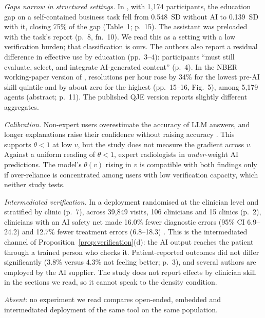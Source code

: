 \documentclass[12pt]{article}
\theoremstyle{remark}
\begin{document}
\emph{Gaps narrow in structured settings.} In \citet{cruces2026narrow}, with 1,174 participants, the education gap on a self-contained business task fell from 0.548~SD without AI to 0.139~SD with it, closing 75\% of the gap (Table~1; p.~15). The assistant was preloaded with the task's report (p.~8, fn.~10). We read this as a setting with a low verification burden; that classification is ours. The authors also report a residual difference in effective use by education (pp.~3--4): participants ``must still evaluate, select, and integrate AI-generated content'' (p.~4). In the NBER working-paper version of \citet{brynjolfsson2025work}, resolutions per hour rose by 34\% for the lowest pre-AI skill quintile and by about zero for the highest (pp.~15--16, Fig.~5), among 5,179 agents (abstract; p.~11). The published QJE version reports slightly different aggregates.

\emph{Calibration.} Non-expert users overestimate the accuracy of LLM answers, and longer explanations raise their confidence without raising accuracy \citep[arXiv v2, pp.~12--13; 301 participants, p.~8]{steyvers2025know}. This supports $\theta<1$ at low $v$, but the study does not measure the gradient across $v$. Against a uniform reading of $\theta<1$, expert radiologists in \citet[abstract]{agarwal2023radiology} \emph{under}-weight AI predictions. The model's $\theta(v)$ rising in $v$ is compatible with both findings only if over-reliance is concentrated among users with low verification capacity, which neither study tests.

\emph{Intermediated verification.} In a deployment randomised at the clinician level and stratified by clinic (p.~7), across 39,849 visits, 106 clinicians and 15 clinics (p.~2), clinicians with an AI safety net made 16.0\% fewer diagnostic errors (95\% CI 6.9--24.2) and 12.7\% fewer treatment errors (6.8--18.3) \citep[Table~3, p.~16]{korom2025penda}. This is the intermediated channel of Proposition~\ref{prop:verification}(d): the AI output reaches the patient through a trained person who checks it. Patient-reported outcomes did not differ significantly (3.8\% versus 4.3\% not feeling better; p.~3), and several authors are employed by the AI supplier. The study does not report effects by clinician skill in the sections we read, so it cannot speak to the density condition.

\emph{Absent:} no experiment we read compares open-ended, embedded and intermediated deployment of the same tool on the same population.
\end{document}
